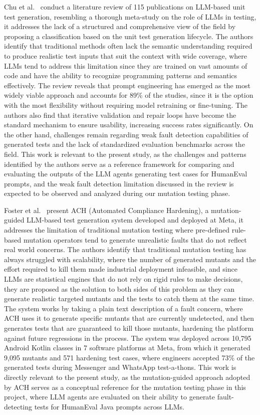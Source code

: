\documentclass[journal]{IEEEtran}
\begin{document}
Chu et al.~\cite{chusurvey} conduct a literature review of 115 publications on LLM-based unit test generation, resembling a thorough meta-study on the role of LLMs in testing, it addresses the lack of a structured and comprehensive view of the field by proposing a classification based on the unit test generation lifecycle. The authors identify that traditional methods often lack the semantic understanding required to produce realistic test inputs that suit the context with wide coverage, where LLMs tend to address this limitation since they are trained on vast amounts of code and have the ability to recognize programming patterns and semantics effectively. The review reveals that prompt engineering has emerged as the most widely viable approach and accounts for 89\% of the studies, since it is the option with the most flexibility without requiring model retraining or fine-tuning. The authors also find that iterative validation and repair loops have become the standard mechanism to ensure usability, increasing success rates significantly. On the other hand, challenges remain regarding weak fault detection capabilities of generated tests and the lack of standardized evaluation benchmarks across the field. This work is relevant to the present study, as the challenges and patterns identified by the authors serve as a reference framework for comparing and evaluating the outputs of the LLM agents generating test cases for HumanEval prompts, and the weak fault detection limitation discussed in the review is expected to be observed and analyzed during our mutation testing phase.

Foster et al.~\cite{ach} present ACH (Automated Compliance Hardening), a mutation-guided LLM-based test generation system developed and deployed at Meta, it addresses the limitation of traditional mutation testing where pre-defined rule-based mutation operators tend to generate unrealistic faults that do not reflect real world concerns. The authors identify that traditional mutation testing has always struggled with scalability, where the number of generated mutants and the effort required to kill them made industrial deployment infeasible, and since LLMs are statistical engines that do not rely on rigid rules to make decisions, they are proposed as the solution to both sides of this problem as they can generate realistic targeted mutants and the tests to catch them at the same time. The system works by taking a plain text description of a fault concern, where ACH uses it to generate specific mutants that are currently undetected, and then generates tests that are guaranteed to kill those mutants, hardening the platform against future regressions in the process. The system was deployed across 10,795 Android Kotlin classes in 7 software platforms at Meta, from which it generated 9,095 mutants and 571 hardening test cases, where engineers accepted 73\% of the generated tests during Messenger and WhatsApp test-a-thons. This work is directly relevant to the present study, as the mutation-guided approach adopted by ACH serves as a conceptual reference for the mutation testing phase in this project, where LLM agents are evaluated on their ability to generate fault-detecting tests for HumanEval Java prompts across LLMs.
\end{document}
